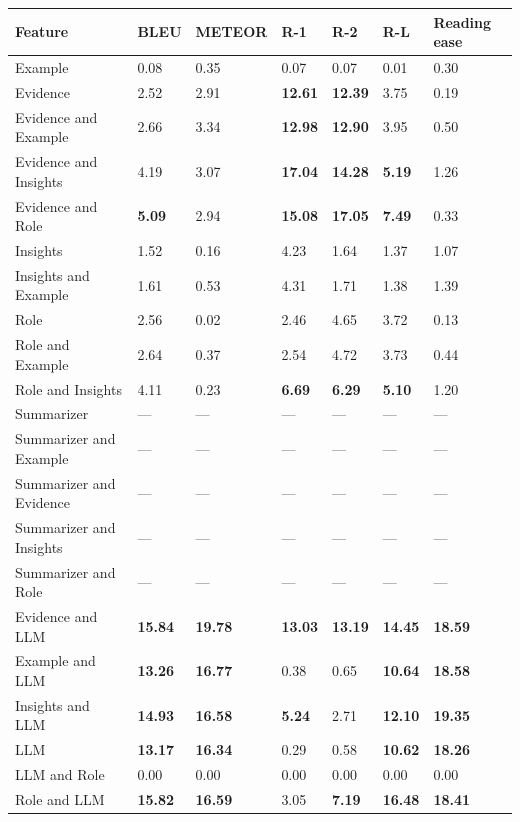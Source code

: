 \begin{tabular}{|l|l|l|l|l|l|l|}
\hline
\textbf{Feature} & BLEU & METEOR & R-1 & R-2 & R-L & Reading ease \\
 \hline
 Example & 0.08 & 0.35 & 0.07 & 0.07 & 0.01 & 0.30 \\
 \hline
 Evidence & 2.52 & 2.91 & \textbf{12.61} & \textbf{12.39} & 3.75 & 0.19 \\
 \hline
 Evidence and Example & 2.66 & 3.34 & \textbf{12.98} & \textbf{12.90} & 3.95 & 0.50 \\
 \hline
 Evidence and Insights & 4.19 & 3.07 & \textbf{17.04} & \textbf{14.28} & \textbf{5.19} & 1.26 \\
 \hline
 Evidence and Role & \textbf{5.09} & 2.94 & \textbf{15.08} & \textbf{17.05} & \textbf{7.49} & 0.33 \\
 \hline
 Insights & 1.52 & 0.16 & 4.23 & 1.64 & 1.37 & 1.07 \\
 \hline
 Insights and Example & 1.61 & 0.53 & 4.31 & 1.71 & 1.38 & 1.39 \\
 \hline
 Role & 2.56 & 0.02 & 2.46 & 4.65 & 3.72 & 0.13 \\
 \hline
 Role and Example & 2.64 & 0.37 & 2.54 & 4.72 & 3.73 & 0.44 \\
 \hline
 Role and Insights & 4.11 & 0.23 & \textbf{6.69} & \textbf{6.29} & \textbf{5.10} & 1.20 \\
 \hline
 Summarizer & — & — & — & — & — & — \\
 \hline
 Summarizer and Example & — & — & — & — & — & — \\
 \hline
 Summarizer and Evidence & — & — & — & — & — & — \\
 \hline
 Summarizer and Insights & — & — & — & — & — & — \\
 \hline
 Summarizer and Role & — & — & — & — & — & — \\
 \hline
 Evidence and LLM & \textbf{15.84} & \textbf{19.78} & \textbf{13.03} & \textbf{13.19} & \textbf{14.45} & \textbf{18.59} \\
 \hline
 Example and LLM & \textbf{13.26} & \textbf{16.77} & 0.38 & 0.65 & \textbf{10.64} & \textbf{18.58} \\
 \hline
 Insights and LLM & \textbf{14.93} & \textbf{16.58} & \textbf{5.24} & 2.71 & \textbf{12.10} & \textbf{19.35} \\
 \hline
 LLM & \textbf{13.17} & \textbf{16.34} & 0.29 & 0.58 & \textbf{10.62} & \textbf{18.26} \\
 \hline
 LLM and Role & 0.00 & 0.00 & 0.00 & 0.00 & 0.00 & 0.00 \\
 \hline
 Role and LLM & \textbf{15.82} & \textbf{16.59} & 3.05 & \textbf{7.19} & \textbf{16.48} & \textbf{18.41} \\
\hline
\end{tabular}
